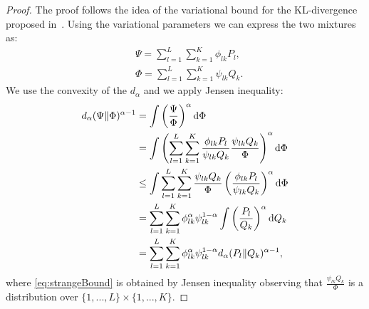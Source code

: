 \documentclass{article}
\begin{document}
\begin{proof}
The proof follows the idea of the variational bound for the KL-divergence proposed in~\cite{hershey2007approximating}. Using the variational parameters we can express the two mixtures as:
\begin{align*}
    & \Psi = \sum_{l=1}^L \sum_{k=1}^K \phi_{lk} P_l,\\
    & \Phi = \sum_{l=1}^L \sum_{k=1}^K \psi_{lk} Q_k.
\end{align*}
    We use the convexity of the $d_{\alpha}$ and we apply Jensen inequality:
    \begin{align}
        d_{\alpha}(\Psi \| \Phi)^{\alpha-1} & = \int \left( \frac{\Psi}{\Phi} \right)^{\alpha} \mathrm{d}\Phi \notag\\
        & = \int \left( \sum_{l=1}^L \sum_{k=1}^K \frac{\phi_{lk} P_l}{\psi_{lk} Q_k} \frac{\psi_{lk} Q_k}{\Phi} \right)^{\alpha} \mathrm{d}\Phi \notag \\
        & \le \int \sum_{l=1}^L \sum_{k=1}^K \frac{\psi_{lk} Q_k}{\Phi} \left(  \frac{\phi_{lk} P_l}{\psi_{lk} Q_k}  \right)^{\alpha} \mathrm{d}\Phi \label{eq:strangeBound}\\
        & = \sum_{l=1}^L \sum_{k=1}^K \phi_{lk}^{\alpha} \psi_{lk}^{1-\alpha}  \int \left( \frac{P_l}{Q_k}  \right)^{\alpha} \mathrm{d}Q_k \notag \\
        & = \sum_{l=1}^L \sum_{k=1}^K \phi_{lk}^{\alpha} \psi_{lk}^{1-\alpha}  d_{\alpha}(P_l \| Q_k)^{\alpha-1}, \notag
    \end{align}
    where \eqref{eq:strangeBound} is obtained by Jensen inequality observing that $\frac{\psi_{lk} Q_k}{\Phi}$ is a distribution over $\{1,...,L\} \times \{1,...,K\}$.
\end{proof}
\end{document}
